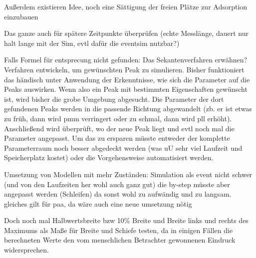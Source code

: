 Außerdem existieren Idee, noch eine Sättigung der freien Plätze zur Adsorption einzubauen

Das ganze auch für spätere Zeitpunkte überprüfen (echte Messlänge, dauert nur halt lange mit der Sim, evtl dafür die eventsim nutzbar?)

Falls Formel für entsprecung nicht gefunden: Das Sekantenverfahren erwähnen?
Verfahren entwickeln, um gewünschten Peak zu simulieren. Bisher funktioniert das händisch unter Anwendung der Erkenntnisse, wie sich die Parameter auf die Peaks auswirken. Wenn also ein Peak mit bestimmten Eigenschaften gewünscht ist, wird bisher die grobe Umgebung abgesucht. Die Parameter der dort gefundenen Peaks werden in die passende Richtung abgewandelt (zb. er ist etwas zu früh, dann wird pmm verringert oder zu schmal, dann wird pll erhöht). Anschließend wird überprüft, wo der neue Peak liegt und evtl noch mal die Parameter angepasst. 
Um das zu ersparen müsste entweder der komplette Parameterraum noch besser abgedeckt werden (was uU sehr viel Laufzeit und Speicherplatz kostet) oder die Vorgehensweise automatisiert werden.

Umsetzung von Modellen mit mehr Zuständen: Simulation als event nicht schwer (und von den Laufzeiten her wohl auch ganz gut) die by-step müsste aber angepasst werden (Schleifen) da sonst wohl zu aufwändig und zu langsam. gleiches gilt für paa, da wäre auch eine neue umsetzung nötig

Doch noch mal Halbwertsbreite bzw 10\% Breite und Breite links und rechts des Maximums als Maße für Breite und Schiefe testen, da in einigen Fällen die berechneten Werte den vom menschlichen Betrachter gewonnenen Eindruck widersprechen.